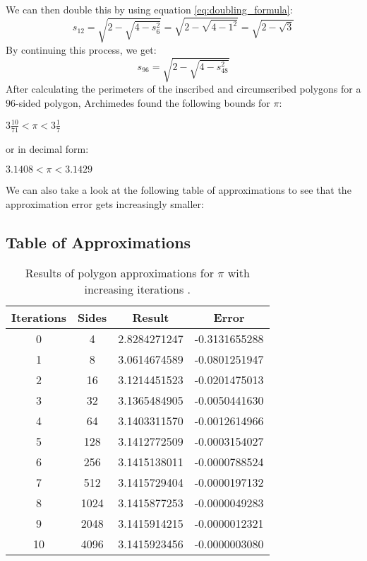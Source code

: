 \documentclass[12pt]{article}
\begin{document}
\noindent We can then double this by using equation \ref{eq:doubling_formula}:
\begin{equation}
    s_{12} = \sqrt{2 - \sqrt{4 - s_6^2}} = \sqrt{2 - \sqrt{4 - 1^2}} = \sqrt{2 - \sqrt{3}}
\end{equation}
By continuing this process, we get:
\begin{equation}
    s_{96} = \sqrt{2 - \sqrt{4 - s_{48}^2}}
\end{equation}
After calculating the perimeters of the inscribed and circumscribed polygons for a $96$-sided polygon, Archimedes found the following bounds for $\pi$:
\begin{center}
    $3 \frac{10}{71} < \pi < 3\frac{1}{7}$
\end{center}
or in decimal form:
\begin{center}
    $3.1408 < \pi < 3.1429$
\end{center}
We can also take a look at the following table of approximations to see that the approximation error gets increasingly smaller:
\subsection*{Table of Approximations}

\begin{table}[h]
    \centering
    \begin{tabular}{cccc}
        \toprule
        \textbf{Iterations} & \textbf{Sides} & \textbf{Result} & \textbf{Error} \\
        \midrule
        0  & 4     & 2.8284271247 & -0.3131655288 \\
        1  & 8     & 3.0614674589 & -0.0801251947 \\
        2  & 16    & 3.1214451523 & -0.0201475013 \\
        3  & 32    & 3.1365484905 & -0.0050441630 \\
        4  & 64    & 3.1403311570 & -0.0012614966 \\
        5  & 128   & 3.1412772509 & -0.0003154027 \\
        6  & 256   & 3.1415138011 & -0.0000788524 \\
        7  & 512   & 3.1415729404 & -0.0000197132 \\
        8  & 1024  & 3.1415877253 & -0.0000049283 \\
        9  & 2048  & 3.1415914215 & -0.0000012321 \\
        10 & 4096  & 3.1415923456 & -0.0000003080 \\
        \bottomrule
    \end{tabular}
    \caption{Results of polygon approximations for \(\pi\) with increasing iterations \cite{craigwood2023}.}
    \label{tab:pi_approximation}
\end{table}
\end{document}
